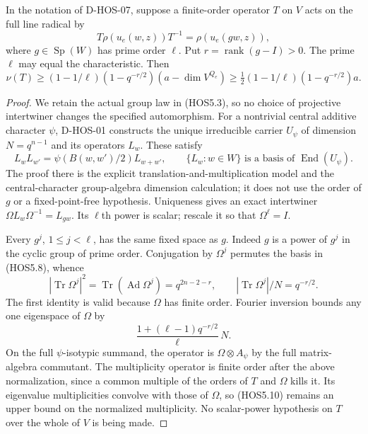 \begin{lemma}
\label{D-HOS-08}
In the notation of D-HOS-07, suppose a finite-order operator $T$ on
$V$ acts on the full line radical by
\[
             T\rho(u_e(w,z))T^{-1}=\rho(u_e(gw,z)),
                                                               \tag{HOS5.6}
\]
where $g\in\operatorname{Sp}(W)$ has prime order $\ell$. Put
$r=\operatorname{rank}(g-I)>0$. The prime $\ell$ may equal the
characteristic. Then
\[
 \nu(T)\ge (1-1/\ell)(1-q^{-r/2})(a-\dim V^{Q_e})
          \ge\tfrac12(1-1/\ell)(1-q^{-r/2})a.                \tag{HOS5.7}
\]
\end{lemma}

\begin{proof}
We retain the actual group law in (HOS5.3), so no choice of projective
intertwiner changes the specified automorphism. For a nontrivial
central additive character $\psi$, D-HOS-01 constructs the unique
irreducible carrier $U_\psi$ of dimension $N=q^{n-1}$ and its
operators $L_w$. These satisfy
\[
 L_wL_{w'}=\psi(B(w,w')/2)L_{w+w'},\qquad
 \{L_w:w\in W\}\text{ is a basis of }\operatorname{End}(U_\psi).
                                                               \tag{HOS5.8}
\]
The proof there is the explicit translation-and-multiplication model
and the central-character group-algebra dimension calculation; it
does not use the order of $g$ or a fixed-point-free hypothesis.
Uniqueness gives an exact intertwiner
$\Omega L_w\Omega^{-1}=L_{gw}$. Its $\ell$th power is scalar;
rescale it so that $\Omega^\ell=I$.

Every $g^j$, $1\le j<\ell$, has the same fixed space as $g$.
Indeed $g$ is a power of $g^j$ in the cyclic group of prime order.
Conjugation by $\Omega^j$ permutes the basis in (HOS5.8), whence
\[
 |\operatorname{Tr}\Omega^j|^2
 =\operatorname{Tr}(\operatorname{Ad}\Omega^j)
 =q^{2n-2-r},\qquad
 |\operatorname{Tr}\Omega^j|/N=q^{-r/2}.                     \tag{HOS5.9}
\]
The first identity is valid because $\Omega$ has finite order.
Fourier inversion bounds any one eigenspace of $\Omega$ by
\[
              \frac{1+(\ell-1)q^{-r/2}}{\ell}\,N.
                                                               \tag{HOS5.10}
\]
On the full $\psi$-isotypic summand, the operator is
$\Omega\otimes A_\psi$ by the full matrix-algebra commutant.
The multiplicity operator is finite order after the above
normalization, since a common multiple of the orders of $T$ and
$\Omega$ kills it. Its eigenvalue multiplicities convolve with
those of $\Omega$, so (HOS5.10) remains an upper bound on the
normalized multiplicity. No scalar-power hypothesis on $T$ over
the whole of $V$ is being made.


\end{proof}

